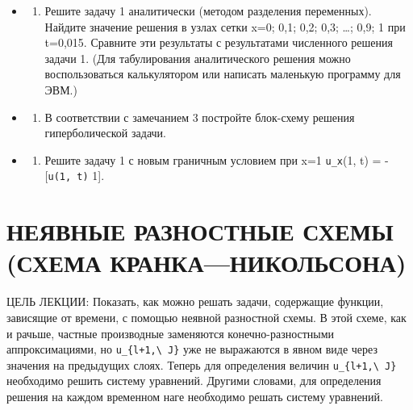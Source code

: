 \documentclass[
  ukrainian,
]{article}
\providecommand{\tightlist}{%
  \setlength{\itemsep}{0pt}\setlength{\parskip}{0pt}}
\begin{document}
\begin{itemize}
\tightlist
\item
  \begin{enumerate}
  \def\labelenumi{\arabic{enumi}.}
  \setcounter{enumi}{1}
  \tightlist
  \item
    Решите задачу 1 аналитически (методом разделения переменных).
    Найдите значение решения в узлах сетки x=0; 0,1; 0,2; 0,3; \ldots;
    0,9; 1 при t=0,015. Сравните эти результаты с результатами
    численного решения задачи 1. (Для табулирования аналитического
    решения можно воспользоваться калькулятором или написать маленькую
    программу для ЭВМ.)
  \end{enumerate}
\item
  \begin{enumerate}
  \def\labelenumi{\arabic{enumi}.}
  \setcounter{enumi}{2}
  \tightlist
  \item
    В соответствии с замечанием 3 постройте блок-схему решения
    гиперболической задачи.
  \end{enumerate}
\item
  \begin{enumerate}
  \def\labelenumi{\arabic{enumi}.}
  \setcounter{enumi}{3}
  \tightlist
  \item
    Решите задачу 1 с новым граничным условием при x=1 \texttt{u\_x}(1,
    t) = -{[}\texttt{u(1,\ t)} 1{]}.
  \end{enumerate}
\end{itemize}

\section{НЕЯВНЫЕ РАЗНОСТНЫЕ СХЕМЫ (СХЕМА
КРАНКА---НИКОЛЬСОНА)}\label{ux43dux435ux44fux432ux43dux44bux435-ux440ux430ux437ux43dux43eux441ux442ux43dux44bux435-ux441ux445ux435ux43cux44b-ux441ux445ux435ux43cux430-ux43aux440ux430ux43dux43aux430ux43dux438ux43aux43eux43bux44cux441ux43eux43dux430}

ЦЕЛЬ ЛЕКЦИИ: Показать, как можно решать задачи, содержащие функции,
зависящие от времени, с помощью неявной разностной схемы. В этой схеме,
как и рачьше, частные производные заменяются конечно-разностными
аппроксимациями, но \texttt{u\_\{l+1,\textbackslash{}\ J\}} уже не
выражаются в явном виде через значения на предыдущих слоях. Теперь для
определения величин \texttt{u\_\{l+1,\textbackslash{}\ J\}} необходимо
решить систему уравнений. Другими словами, для определения решения на
каждом временном наге необходимо решать систему уравнений.
\end{document}
